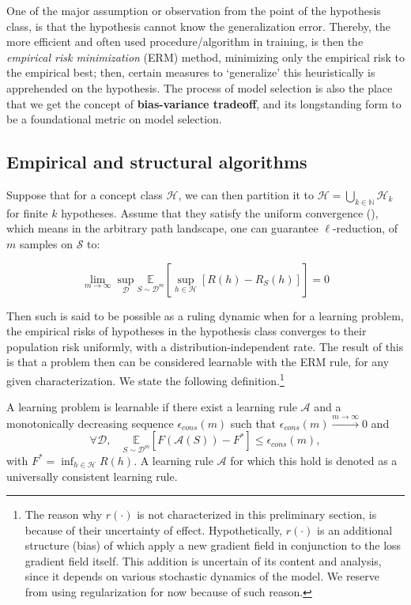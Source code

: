 \documentclass[
  journal=largetwo,
  year=2025,
  volume=37,
]{cup-journal}
\begin{document}
One of the major assumption or observation from the point of the hypothesis class, is that the hypothesis cannot know the generalization error. Thereby, the more efficient and often used procedure/algorithm in training, is then the \textit{empirical risk minimization} (ERM) method, minimizing only the empirical risk to the empirical best; then, certain measures to `generalize' this heuristically is apprehended on the hypothesis. The process of model selection is also the place that we get the concept of \textbf{bias-variance tradeoff}, and its longstanding form to be a foundational metric on model selection. 

\subsection{Empirical and structural algorithms}

Suppose that for a concept class $\mathcal{H}$, we can then partition it to $\mathcal{H}=\bigcup_{k\in \mathbb{N}} \mathcal{H}_{k}$ for finite $k$ hypotheses. Assume that they satisfy the uniform convergence (\cite{JMLR:v11:shalev-shwartz10a}), which means in the arbitrary path landscape, one can guarantee $\ell$-reduction, of $m$ samples on $\mathcal{S}$ to:

\begin{equation}
    \lim_{m\to \infty} \sup_{\mathcal{D}} \underset{S\sim\mathcal{D}^{m}}{\mathbb{E}} \left[ \sup_{h\in\mathcal{H}} [R(h) - R_{S}(h)] \right] = 0
\end{equation}

Then such is said to be possible as a ruling dynamic when for a learning problem, the empirical risks of hypotheses in the hypothesis class converges to their population risk uniformly, with a distribution-independent rate. The result of this is that a problem then can be considered learnable with the ERM rule, for any given characterization. We state the following definition.\footnote{The reason why $r(\cdot)$ is not characterized in this preliminary section, is because of their uncertainty of effect. Hypothetically, $r(\cdot)$ is an additional structure (bias) of which apply a new gradient field in conjunction to the loss gradient field itself. This addition is uncertain of its content and analysis, since it depends on various stochastic dynamics of the model. We reserve from using regularization for now because of such reason.}

\begin{definition}
    A learning problem is learnable if there exist a learning rule $\mathcal{A}$ and a monotonically decreasing sequence $\epsilon_{cons}(m)$ such that $\epsilon_{cons}(m)\overset{m\to\infty}{\longrightarrow} 0$ and \begin{equation}
        \forall \mathcal{D} , \quad \underset{S\sim\mathcal{D}^{m}}{\mathbb{E}} \left[F(\mathcal{A}(S))-F^{*}\right] \leq \epsilon_{cons}(m),
    \end{equation}
    with $F^{*} = \inf_{h\in\mathcal{H}} R(h)$. A learning rule $\mathcal{A}$ for which this hold is denoted as a universally consistent learning rule. 
\end{definition}
\end{document}
